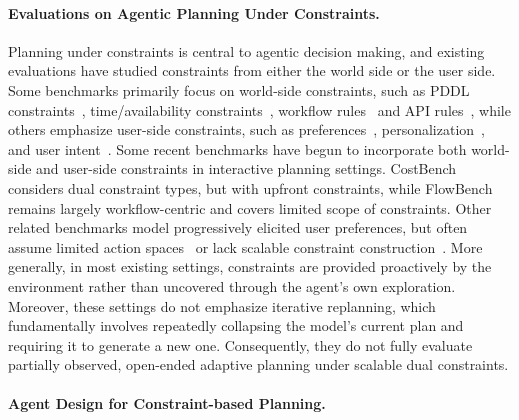 \documentclass{llmxive}
\begin{document}
\paragraph{Evaluations on Agentic Planning Under Constraints.}
Planning under constraints is central to agentic decision making, and existing evaluations have studied constraints from either the world side or the user side.
Some benchmarks primarily focus on world-side constraints, such as PDDL constraints~\citep{PlanBench}, time/availability constraints~\citep{NATURAL-PLAN}, workflow rules~\citep{FlowBench} and API rules~\cite{appworld}, while others emphasize user-side constraints, such as preferences~\citep{PrefEval,RealPref}, personalization~\citep{PersonaMem-v1,PersonaMem-v2}, and user intent~\citep{UserBench,wang-etal-2024-user}. 
Some recent benchmarks have begun to incorporate both world-side and user-side constraints in interactive planning settings. 
CostBench~\citep{costbench} considers dual constraint types, but with upfront constraints, while FlowBench~\citep{FlowBench} remains largely workflow-centric and covers limited scope of constraints. 
Other related benchmarks model progressively elicited user preferences, but often assume limited action spaces~\citep{TravelPlanner,luo2025ultrahorizon} or lack scalable constraint construction~\citep{tau-bench}. 
More generally, in most existing settings, constraints are provided proactively by the environment rather than uncovered through the agent’s own exploration. 
Moreover, these settings do not emphasize iterative replanning, which fundamentally involves repeatedly collapsing the model’s current plan and requiring it to generate a new one. 
Consequently, they do not fully evaluate partially observed, open-ended adaptive planning under scalable dual constraints.

\paragraph{Agent Design for Constraint-based Planning.}
\end{document}
